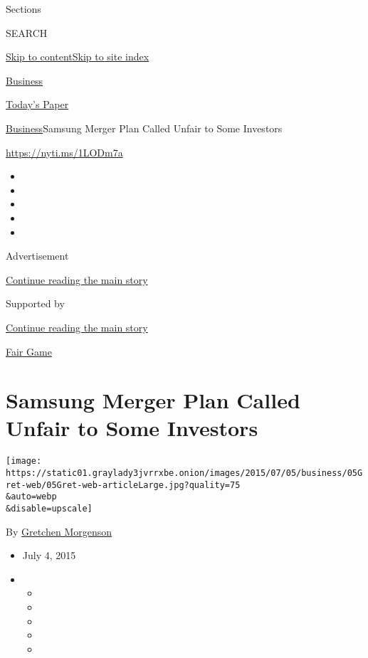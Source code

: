 Sections

SEARCH

\protect\hyperlink{site-content}{Skip to
content}\protect\hyperlink{site-index}{Skip to site index}

\href{https://www.nytimes3xbfgragh.onion/section/business}{Business}

\href{https://myaccount.nytimes3xbfgragh.onion/auth/login?response_type=cookie\&client_id=vi}{}

\href{https://www.nytimes3xbfgragh.onion/section/todayspaper}{Today's
Paper}

\href{/section/business}{Business}\textbar{}Samsung Merger Plan Called
Unfair to Some Investors

\url{https://nyti.ms/1LODm7a}

\begin{itemize}
\item
\item
\item
\item
\item
\end{itemize}

Advertisement

\protect\hyperlink{after-top}{Continue reading the main story}

Supported by

\protect\hyperlink{after-sponsor}{Continue reading the main story}

\href{/column/fair-game}{Fair Game}

\hypertarget{samsung-merger-plan-called-unfair-to-some-investors}{%
\section{Samsung Merger Plan Called Unfair to Some
Investors}\label{samsung-merger-plan-called-unfair-to-some-investors}}

\texttt{[image: https://static01.graylady3jvrrxbe.onion/images/2015/07/05/business/05Gret-web/05Gret-web-articleLarge.jpg?quality=75\\\&auto=webp\\\&disable=upscale]}

By
\href{http://www.nytimes3xbfgragh.onion/by/gretchen-morgenson}{Gretchen
Morgenson}

\begin{itemize}
\item
  July 4, 2015
\item
  \begin{itemize}
  \item
  \item
  \item
  \item
  \item
  \end{itemize}
\end{itemize}

